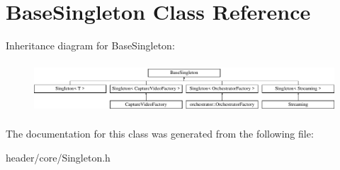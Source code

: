 \hypertarget{class_base_singleton}{}\section{Base\+Singleton Class Reference}
\label{class_base_singleton}
Inheritance diagram for Base\+Singleton\+:\begin{figure}[H]
\begin{center}
\leavevmode
\includegraphics[height=1.926605cm]{d0/d85/class_base_singleton}
\end{center}
\end{figure}


The documentation for this class was generated from the following file\+:\begin{DoxyCompactItemize}
\item 
header/core/Singleton.\+h\end{DoxyCompactItemize}
